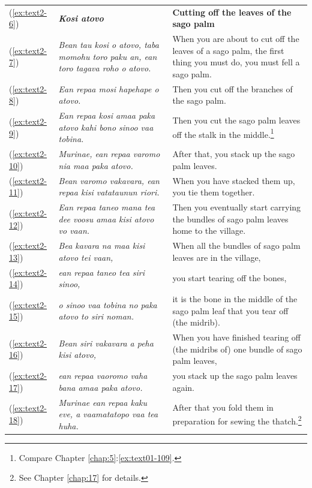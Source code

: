 \documentclass[output=paper]{langscibook}
\begin{document}
\begin{xltabular}{\textwidth}{lXX}
    (\ref{ex:text2-6})&\textit{\textbf{Kosi atovo}}&\textbf{Cutting off the leaves of the sago palm}\\
    (\ref{ex:text2-7})&\textit{Bean tau kosi o atovo, taba momohu toro paku an, ean toro tagava roho o atovo.}&When you are about to cut off the leaves of a sago palm, the first thing you must do, you must fell a sago palm.\\
    (\ref{ex:text2-8})&\textit{Ean repaa mosi hapehape o atovo.}&Then you cut off the branches of the sago palm.\\
    (\ref{ex:text2-9})&\textit{Ean repaa kosi amaa paka atovo kahi bono sinoo vaa tobina.}&Then you cut the sago palm leaves off the stalk in the middle.\footnote{Compare Chapter \ref{chap:5}:\ref{ex:text01-109}.}\\
    (\ref{ex:text2-10})&\textit{Murinae, ean repaa varomo nia maa paka atovo.}&After that, you stack up the sago palm leaves.\\
    (\ref{ex:text2-11})&\textit{Bean varomo vakavara, ean repaa kisi vatataunun riori.}&When you have stacked them up, you tie them together.\\
    (\ref{ex:text2-12})&\textit{Ean repaa taneo mana tea dee voosu amaa kisi atovo vo vaan. 	}&Then you eventually start carrying the bundles of sago palm leaves home to the village.\\
    (\ref{ex:text2-13})&\textit{Bea kavara na maa kisi atovo tei vaan,}&When all the bundles of sago palm leaves are in the village,\\
    (\ref{ex:text2-14})&\textit{ean repaa taneo tea siri sinoo,}&you start tearing off the bones,\\
    (\ref{ex:text2-15})&\textit{o sinoo vaa tobina no paka atovo to siri noman.}&it is the bone in the middle of the sago palm leaf that you tear off (the midrib).\\
    (\ref{ex:text2-16})&\textit{Bean siri vakavara a peha kisi atovo,}&When you have finished tearing off (the midribs of) one bundle of sago palm leaves,\\
    (\ref{ex:text2-17})&\textit{ean repaa vaoromo vaha bana amaa paka atovo.}&you stack up the sago palm leaves again.\\
    (\ref{ex:text2-18})&\textit{Murinae ean repaa kaku eve, a vaamatatopo vaa tea huha.}&After that you fold them in preparation for sewing the thatch.\footnote{See Chapter \ref{chap:17} for details.}\\
\end{xltabular}
\end{document}
